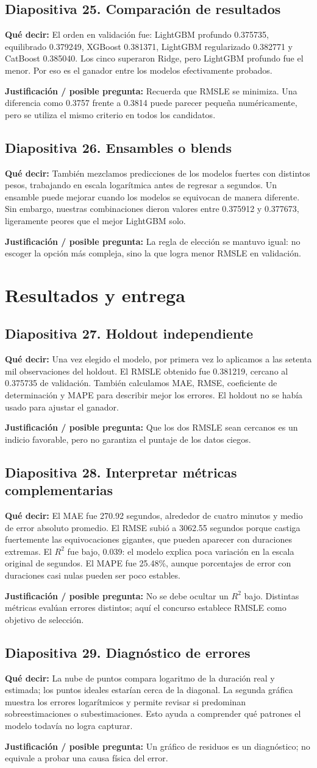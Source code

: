 \documentclass[11pt,letterpaper]{article}
\newcommand{\lamina}[2]{\subsection*{Diapositiva #1. #2}}
\newcommand{\explica}[1]{\noindent\textcolor{azul}{\textbf{Qué decir:}} #1\par\smallskip}
\newcommand{\defiende}[1]{\noindent\textcolor{verde}{\textbf{Justificación / posible pregunta:}} #1\par\medskip}
\begin{document}
\lamina{25}{Comparación de resultados}
\explica{El orden en validación fue: LightGBM profundo 0.375735, equilibrado 0.379249, XGBoost 0.381371, LightGBM regularizado 0.382771 y CatBoost 0.385040. Los cinco superaron Ridge, pero LightGBM profundo fue el menor. Por eso es el ganador entre los modelos efectivamente probados.}
\defiende{Recuerda que RMSLE se minimiza. Una diferencia como 0.3757 frente a 0.3814 puede parecer pequeña numéricamente, pero se utiliza el mismo criterio en todos los candidatos.}

\lamina{26}{Ensambles o blends}
\explica{También mezclamos predicciones de los modelos fuertes con distintos pesos, trabajando en escala logarítmica antes de regresar a segundos. Un ensamble puede mejorar cuando los modelos se equivocan de manera diferente. Sin embargo, nuestras combinaciones dieron valores entre 0.375912 y 0.377673, ligeramente peores que el mejor LightGBM solo.}
\defiende{La regla de elección se mantuvo igual: no escoger la opción más compleja, sino la que logra menor RMSLE en validación.}

\section{Resultados y entrega}
\lamina{27}{Holdout independiente}
\explica{Una vez elegido el modelo, por primera vez lo aplicamos a las setenta mil observaciones del holdout. El RMSLE obtenido fue 0.381219, cercano al 0.375735 de validación. También calculamos MAE, RMSE, coeficiente de determinación y MAPE para describir mejor los errores. El holdout no se había usado para ajustar el ganador.}
\defiende{Que los dos RMSLE sean cercanos es un indicio favorable, pero no garantiza el puntaje de los datos ciegos.}

\lamina{28}{Interpretar métricas complementarias}
\explica{El MAE fue 270.92 segundos, alrededor de cuatro minutos y medio de error absoluto promedio. El RMSE subió a 3062.55 segundos porque castiga fuertemente las equivocaciones gigantes, que pueden aparecer con duraciones extremas. El $R^2$ fue bajo, 0.039: el modelo explica poca variación en la escala original de segundos. El MAPE fue 25.48\%, aunque porcentajes de error con duraciones casi nulas pueden ser poco estables.}
\defiende{No se debe ocultar un $R^2$ bajo. Distintas métricas evalúan errores distintos; aquí el concurso establece RMSLE como objetivo de selección.}

\lamina{29}{Diagnóstico de errores}
\explica{La nube de puntos compara logaritmo de la duración real y estimada; los puntos ideales estarían cerca de la diagonal. La segunda gráfica muestra los errores logarítmicos y permite revisar si predominan sobreestimaciones o subestimaciones. Esto ayuda a comprender qué patrones el modelo todavía no logra capturar.}
\defiende{Un gráfico de residuos es un diagnóstico; no equivale a probar una causa física del error.}
\end{document}

